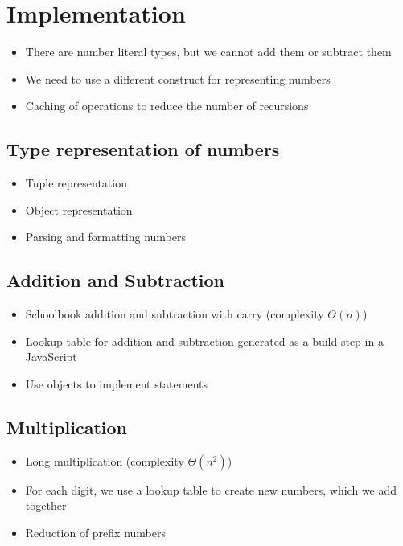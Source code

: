 \chapter{Implementation}

\begin{itemize}
  \item There are number literal types, but we cannot add them or subtract them
  \item We need to use a different construct for representing numbers
  \item Caching of operations to reduce the number of recursions
\end{itemize}

\section{Type representation of numbers}

\begin{itemize}
  \item Tuple representation
  \item Object representation
  \item Parsing and formatting numbers 
\end{itemize}

\section{Addition and Subtraction}

\begin{itemize}
  \item Schoolbook addition and subtraction with carry (complexity $\Theta(n)$)
  \item Lookup table for addition and subtraction generated as a build step in a JavaScript
  \item Use objects to implement  statements
\end{itemize}

\section{Multiplication}

\begin{itemize}
  \item Long multiplication (complexity $\Theta(n^2)$)
  \item For each digit, we use a lookup table to create new numbers, which we add together
  \item Reduction of prefix numbers
\end{itemize}

